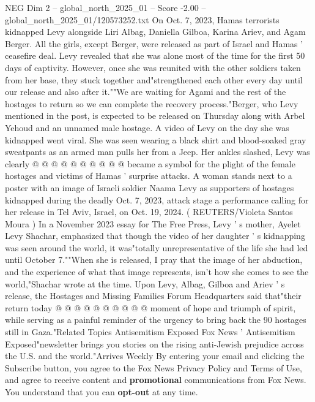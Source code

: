\begin{textsample}{NEG Dim 2 – global\_north\_2025\_01 – Score -2.00 – global\_north\_2025\_01/120573252.txt}  \label{ex:f2_neg_079}
On Oct. 7, 2023, Hamas terrorists kidnapped Levy alongside Liri Albag, Daniella Gilboa, Karina Ariev, and Agam Berger.
All the girls, except Berger, were released as part of Israel and Hamas ' ceasefire deal.
Levy revealed that she was alone most of the time for the first 50 days of captivity.
However, once she was reunited with the other soldiers taken from her base, they stuck together and"strengthened each other every day until our release and also after it.""We are waiting for Agami and the rest of the hostages to return so we can complete the recovery process."Berger, who Levy mentioned in the post, is expected to be released on Thursday along with Arbel Yehoud and an unnamed male hostage.
A video of Levy on the day she was kidnapped went viral.
She was seen wearing a black shirt and blood-soaked gray sweatpants as an armed man pulls her from a Jeep.
Her ankles slashed, Levy was clearly @ @ @ @ @ @ @ @ @ @ became a symbol for the plight of the female hostages and victims of Hamas ' surprise attacks.
A woman stands next to a poster with an image of Israeli soldier Naama Levy as supporters of hostages kidnapped during the deadly Oct. 7, 2023, attack stage a performance calling for her release in Tel Aviv, Israel, on Oct. 19, 2024. ( REUTERS/Violeta Santos Moura ) In a November 2023 essay for The Free Press, Levy ' s mother, Ayelet Levy Shachar, emphasized that though the video of her daughter ' s kidnapping was seen around the world, it was"totally unrepresentative of the life she had led until October 7.""When she is released, I pray that the image of her abduction, and the experience of what that image represents, isn't how she comes to see the world,"Shachar wrote at the time.
Upon Levy, Albag, Gilboa and Ariev ' s release, the Hostages and Missing Families Forum Headquarters said that"their return today @ @ @ @ @ @ @ @ @ @ moment of hope and triumph of spirit, while serving as a painful reminder of the urgency to bring back the 90 hostages still in Gaza."Related Topics Antisemitism Exposed Fox News ' Antisemitism Exposed"newsletter brings you stories on the rising anti-Jewish prejudice across the U.S. and the world."Arrives Weekly By entering your email and clicking the Subscribe button, you agree to the Fox News Privacy Policy and Terms of Use, and agree to receive content and \textbf{promotional} communications from Fox News.
You understand that you can \textbf{opt-out} at any time.

\end{textsample}
